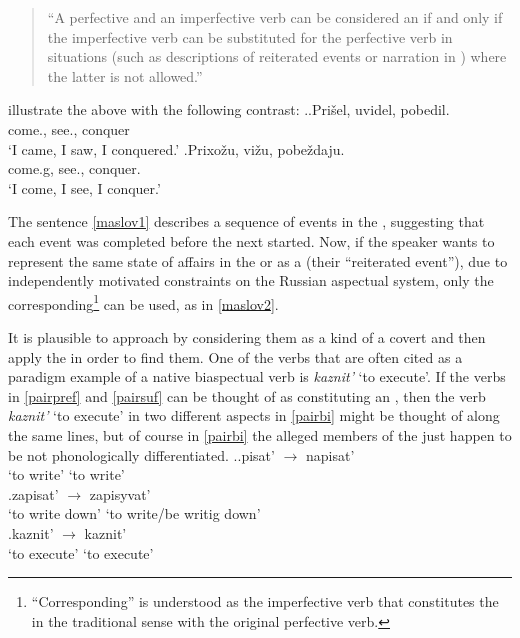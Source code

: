 \begin{quote}
``A perfective and an imperfective verb can be considered an  if and only if the imperfective verb can be substituted for the perfective verb in situations (such as descriptions of reiterated events or narration in ) where the latter is not allowed.'' 
\end{quote}

\citet{Mikaelian:07} illustrate the above with the following contrast: 
\ex.\label{maslov}\ag.\label{maslov1}Pri\v{s}el\textsuperscript{\PF}, uvidel\textsuperscript{\PF}, pobedil.\textsuperscript{\PF}\\
come., see., conquer\\
\trans `I came, I saw, I conquered.'
\bg.\label{maslov2}Prixo\v{z}u\textsuperscript{\IPF}, vi\v{z}u\textsuperscript{\IPF}, pobe\v{z}daju.\textsuperscript{\IPF}\\
come.g, see., conquer.\\
\trans `I come, I see, I conquer.'

The sentence \ref{maslov1} describes a sequence of events in the , suggesting that each event was completed before the next started. Now, if the speaker wants to represent the same state of affairs in the  or as a  (their ``reiterated event''), due to independently motivated constraints on the Russian aspectual system, only the corresponding\footnote{``Corresponding'' is understood as the imperfective verb that constitutes the  in the traditional sense with the original perfective verb.}  can be used, as in \ref{maslov2}.

It is plausible to approach  by considering them as a kind of a covert  and then apply the  in order to find them. One of the verbs that are often cited as a paradigm example of a native biaspectual verb is \emph{kaznit'} `to execute'. If the verbs in \ref{pairpref} and \ref{pairsuf} can be thought of as constituting an , then the verb \textit{kaznit'} `to execute' in two different aspects in \ref{pairbi} might be thought of along the same lines, but of course in \ref{pairbi} the alleged members of the  just happen to be not phonologically differentiated.
\ex.\ag.\label{pairpref}{pisat'\textsuperscript{\IPF}} {$\rightarrow$} {napisat'\textsuperscript{\PF}}\\
{`to write'} {} {`to write'}\\
\bg.\label{pairsuf}{zapisat'\textsuperscript{\IPF}} {$\rightarrow$} {zapisyvat'\textsuperscript{\PF}}\\
{`to write down'} {} {`to write/be writig down'}\\
\bg.\label{pairbi}{kaznit'\textsuperscript{\IPF}} {$\rightarrow$} {kaznit'\textsuperscript{\PF}}\\
{`to execute'} {} {`to execute'}\\

